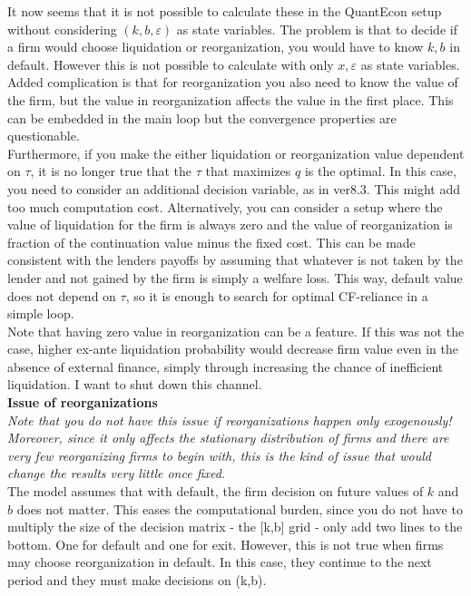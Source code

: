 \documentclass[12pt]{article}
\begin{document}
It now seems that it is not possible to calculate these in the QuantEcon setup without considering $(k,b,\varepsilon)$ as state variables. The problem is that to decide if a firm would choose liquidation or reorganization, you would have to know $k,b$ in default. However this is not possible to calculate with only $x,\varepsilon$ as state variables. Added complication is that for reorganization you also need to know the value of the firm, but the value in reorganization affects the value in the first place. This can be embedded in the main loop but the convergence properties are questionable. \vspace{3mm} \\ 
Furthermore, if you make the either liquidation or reorganization value dependent on $\tau$, it is no longer true that the $\tau$ that maximizes $q$ is the optimal. In this case, you need to consider an additional decision variable, as in ver8.3. This might add too much computation cost. Alternatively, you can consider a setup where the value of liquidation for the firm is always zero and the value of reorganization is fraction of the continuation value minus the fixed cost. This can be made consistent with the lenders payoffs by assuming that whatever is not taken by the lender and not gained by the firm is simply a welfare loss. This way, default value does not depend on $\tau$, so it is enough to search for optimal CF-reliance in a simple loop.  \vspace{3mm} \\
Note that having zero value in reorganization can be a feature. If this was not the case, higher ex-ante liquidation probability would decrease firm value even in the absence of external finance, simply through increasing the chance of inefficient liquidation. I want to shut down this channel. \vspace{3mm} \\
\textbf{Issue of reorganizations} \\
\textit{Note that you do not have this issue if reorganizations happen only exogenously! Moreover, since it only affects the stationary distribution of firms and there are very few reorganizing firms to begin with, this is the kind of issue that would change the results very little once fixed.} \vspace{3mm} \\ The model assumes that with default, the firm decision on future values of $k$ and $b$ does not matter. This eases the computational burden, since you do not have to multiply the size of the decision matrix - the [k,b] grid - only add two lines to the bottom. One for default and one for exit. However, this is not true when firms may choose reorganization in default. In this case, they continue to the next period and they must make decisions on (k,b). \vspace{3mm} \\
\end{document}
